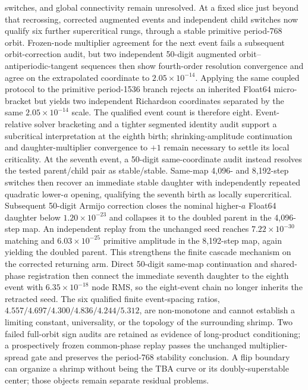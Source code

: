 switches, and global connectivity remain unresolved.
At a fixed slice just beyond that recrossing, corrected augmented events and
independent child switches now qualify six further supercritical rungs,
through a stable primitive period-768 orbit. Frozen-node multiplier agreement
for the next event fails a subsequent orbit-correction audit, but two
independent 50-digit augmented orbit--antiperiodic-tangent sequences then show
fourth-order resolution convergence and agree on the extrapolated coordinate
to $2.05\times10^{-14}$. Applying the same coupled protocol to the primitive
period-1536 branch rejects an inherited Float64 micro-bracket but yields two
independent Richardson coordinates separated by the same
$2.05\times10^{-14}$ scale. The qualified event count is therefore eight.
Event-relative solver bracketing and a tighter segmented identity audit
support a subcritical interpretation at the eighth birth; shrinking-amplitude
continuation and daughter-multiplier convergence to $+1$ remain necessary to
settle its local criticality. At the seventh event, a
50-digit same-coordinate audit instead resolves the tested parent/child pair
as stable/stable. Same-map 4,096- and 8,192-step switches then recover an
immediate stable daughter with independently repeated quadratic lower-$a$
opening, qualifying the seventh birth as locally supercritical. Subsequent
50-digit Armijo correction closes the nominal higher-$a$ Float64 daughter
below $1.20\times10^{-23}$ and collapses it to the doubled parent in the
4,096-step map. An independent replay from the unchanged seed reaches
$7.22\times10^{-30}$ matching and $6.03\times10^{-25}$ primitive amplitude
in the 8,192-step map, again yielding the doubled parent. This strengthens
the finite cascade mechanism on the corrected returning arm. Direct 50-digit
same-map continuation and shared-phase registration then connect the immediate
seventh daughter to the eighth event with $6.35\times10^{-18}$ node RMS, so
the eight-event chain no longer inherits the retracted seed. The six qualified finite
event-spacing ratios, $4.557/4.697/4.300/4.836/4.244/5.312$, are non-monotone and cannot establish a
limiting constant, universality, or the topology of the surrounding shrimp.
Two failed full-orbit sign audits are retained as evidence of long-product
conditioning; a prospectively frozen common-phase replay passes the unchanged
multiplier-spread gate and preserves the period-768 stability conclusion. A flip boundary can
organize a shrimp without being the TBA curve or its doubly-superstable center;
those objects remain separate residual problems.

